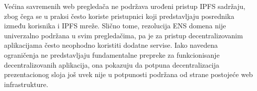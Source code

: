 Većina savremenih web pregledača ne podržava urođeni pristup IPFS sadržaju, zbog čega se u praksi često koriste pristupnici koji predstavljaju posrednika između korisnika i IPFS mreže. Slično tome, rezolucija ENS domena nije univerzalno podržana u svim pregledačima, pa je za pristup decentralizovanim aplikacijama često neophodno koristiti dodatne servise. Iako navedena ograničenja ne predstavljaju fundamentalne prepreke za funkcionisanje decentralizovanih aplikacija, ona pokazuju da potpuna decentralizacija prezentacionog sloja još uvek nije u potpunosti podržana od strane postojeće web infrastrukture.